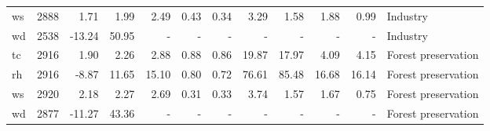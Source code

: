 \begin{table}
\begin{tabular}{lrrrrrrrrrrl}
ws &   2888 &   1.71 &   1.99 &   2.49 &  0.43 &  0.34 &   3.29 &   1.58 &   1.88 &   0.99 &             Industry \\
wd &   2538 & -13.24 &  50.95 &      - &     - &     - &      - &      - &      - &      - &             Industry \\
tc &   2916 &   1.90 &   2.26 &   2.88 &  0.88 &  0.86 &  19.87 &  17.97 &   4.09 &   4.15 &  Forest preservation \\
rh &   2916 &  -8.87 &  11.65 &  15.10 &  0.80 &  0.72 &  76.61 &  85.48 &  16.68 &  16.14 &  Forest preservation \\
ws &   2920 &   2.18 &   2.27 &   2.69 &  0.31 &  0.33 &   3.74 &   1.57 &   1.67 &   0.75 &  Forest preservation \\
wd &   2877 & -11.27 &  43.36 &      - &     - &     - &      - &      - &      - &      - &  Forest preservation \\
\bottomrule
\end{tabular}
\end{table}

